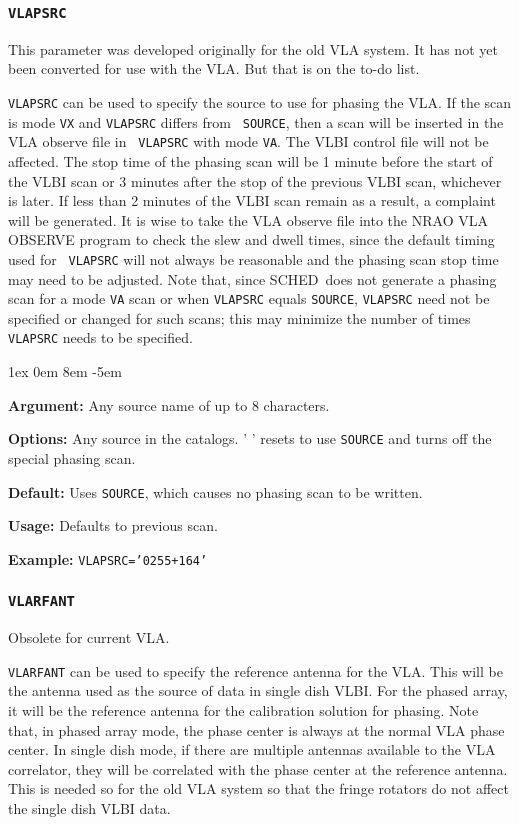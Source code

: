 \documentclass{report}
\newcommand{\schedb}{{\sc SCHED~}}
\newcommand{\rcwbox}[5]{
  \begin{list}{}{\parsep 1ex  \itemsep 0em
                 \leftmargin 8em  \itemindent -5em }
    \item {\bf Argument:} #1
    \item {\bf Options:}  #2
    \item {\bf Default:}  #3
    \item {\bf Usage:}    #4
    \item {\bf Example:}  #5
  \end{list}
}
\begin{document}
\subsubsection{\label{MP:VLAPSRC}{\tt VLAPSRC}}

This parameter was developed originally for the old VLA system.  It has
not yet been converted for use with the VLA.  But that is on the to-do 
list.

{\tt VLAPSRC} can be used to specify the source to use for phasing the
VLA. If the scan is mode {\tt VX} and {\tt VLAPSRC} differs from {\tt
SOURCE}, then a scan will be inserted in the VLA observe file in {\tt
VLAPSRC} with mode {\tt VA}. The VLBI control file will not be
affected. The stop time of the phasing scan will be 1 minute before
the start of the VLBI scan or 3 minutes after the stop of the previous
VLBI scan, whichever is later. If less than 2 minutes of the VLBI scan
remain as a result, a complaint will be generated. It is wise to take
the VLA observe file into the NRAO {\sc VLA OBSERVE} program to check
the slew and dwell times, since the default timing used for {\tt
VLAPSRC} will not always be reasonable and the phasing scan stop time
may need to be adjusted. Note that, since \schedb does not
generate a phasing scan for a mode {\tt VA} scan or when {\tt VLAPSRC}
equals {\tt SOURCE}, {\tt VLAPSRC} need not be specified or changed
for such scans; this may minimize the number of times {\tt VLAPSRC}
needs to be specified.

\rcwbox
{Any source name of up to 8 characters.}
{Any source in the catalogs. ' ' resets to use {\tt SOURCE} and
turns off the special phasing scan.}
{Uses {\tt SOURCE}, which causes no phasing scan to be written.}
{Defaults to previous scan.}
{{\tt VLAPSRC='0255+164'}}


\subsubsection{\label{MP:VLARFANT}{\tt VLARFANT}}

Obsolete for current VLA.

{\tt VLARFANT} can be used to specify the reference antenna for the
VLA.  This will be the antenna used as the source of data in single
dish VLBI.  For the phased array, it will be the reference antenna
for the calibration solution for phasing.  Note that, in phased array
mode, the phase center is always at the normal VLA phase center.  In
single dish mode, if there are multiple antennas available to the
VLA correlator, they will be correlated with the phase center at the
reference antenna.  This is needed so for the old VLA system so that
the fringe rotators do not affect the single dish VLBI data.
\end{document}

